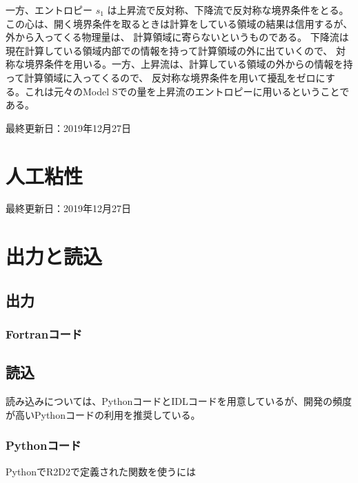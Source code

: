 \documentclass[letterpaper,10pt,dvipdfmx,report]{sphinxmanual}
\begin{document}
一方、エントロピー \(s_1\) は上昇流で反対称、下降流で反対称な境界条件をとる。
この心は、開く境界条件を取るときは計算をしている領域の結果は信用するが、外から入ってくる物理量は、
計算領域に寄らないというものである。 下降流は現在計算している領域内部での情報を持って計算領域の外に出ていくので、
対称な境界条件を用いる。一方、上昇流は、計算している領域の外からの情報を持って計算領域に入ってくるので、
反対称な境界条件を用いて擾乱をゼロにする。これは元々のModel Sでの量を上昇流のエントロピーに用いるということである。

最終更新日：2019年12月27日


\chapter{人工粘性}
\label{\detokenize{artdif:id1}}\label{\detokenize{artdif::doc}}
最終更新日：2019年12月27日


\chapter{出力と読込}
\label{\detokenize{io:id1}}\label{\detokenize{io::doc}}

\section{出力}
\label{\detokenize{io:id2}}

\subsection{Fortranコード}
\label{\detokenize{io:fortran}}

\section{読込}
\label{\detokenize{io:id3}}
読み込みについては、PythonコードとIDLコードを用意しているが、開発の頻度が高いPythonコードの利用を推奨している。


\subsection{Pythonコード}
\label{\detokenize{io:module-R2D2}}\label{\detokenize{io:python}}
PythonでR2D2で定義された関数を使うには

\begin{sphinxVerbatim}[commandchars=\\\{\}]
 
\end{sphinxVerbatim}
\end{document}
